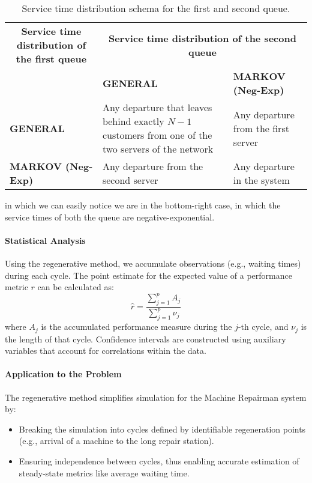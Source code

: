 \documentclass[12pt]{article}
\begin{document}
		\begin{table}[h!]
			\centering
			\renewcommand{\arraystretch}{1.5}
			\begin{tabular}{|m{4cm}|m{4cm}|m{4cm}|}
				\hline
				\multicolumn{1}{|c|}{\textbf{Service time distribution of the first queue}} &
				\multicolumn{2}{c|}{\textbf{Service time distribution of the second queue}} \\ 
				\cline{2-3}
				& \textbf{GENERAL} & \textbf{MARKOV (Neg-Exp)} \\ 
				\hline
				\textbf{GENERAL} & Any departure that leaves behind exactly $N - 1$ customers from one of the two servers of the network & Any departure from the first server \\ 
				\hline
				\textbf{MARKOV (Neg-Exp)} & Any departure from the second server & Any departure in the system \\ 
				\hline
			\end{tabular}
			\caption{Service time distribution schema for the first and second queue.}
		\end{table}
	in which we can easily notice we are in the bottom-right case, in which the service times of both the queue are negative-exponential.
	
	\paragraph{Statistical Analysis}
	Using the regenerative method, we accumulate observations (e.g., waiting times) during each cycle. The point estimate for the expected value of a performance metric $r$ can be calculated as:
	\[
	\hat{r} = \frac{\sum_{j=1}^p A_j}{\sum_{j=1}^p \nu_j}
	\]
	where $A_j$ is the accumulated performance measure during the $j$-th cycle, and $\nu_j$ is the length of that cycle. Confidence intervals are constructed using auxiliary variables that account for correlations within the data.
	
	\paragraph{Application to the Problem}
	The regenerative method simplifies simulation for the Machine Repairman system by:
	\begin{itemize}
		\item Breaking the simulation into cycles defined by identifiable regeneration points (e.g., arrival of a machine to the long repair station).
		\item Ensuring independence between cycles, thus enabling accurate estimation of steady-state metrics like average waiting time.
	\end{itemize}
	
\end{document}
